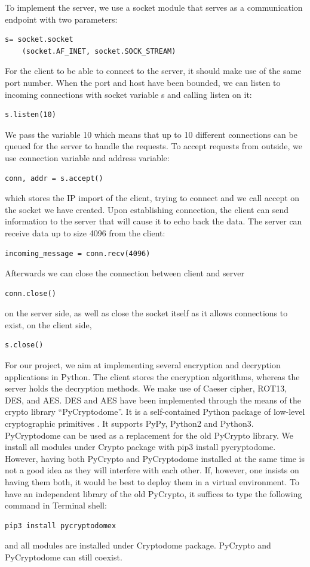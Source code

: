 To implement the server, we use a socket module that serves as a communication endpoint with two parameters:
\begin{verbatim}
s= socket.socket
    (socket.AF_INET, socket.SOCK_STREAM)
\end{verbatim}
For the client to be able to connect to the server, it should make use of the same port number. When the port and host have been bounded, we can listen to incoming connections with socket variable s and calling listen on it:
\begin{verbatim}
s.listen(10)
\end{verbatim}
We pass the variable 10 which means that up to 10 different connections can be queued for the server to handle the requests. To accept requests from outside, we use connection variable and address variable:
\begin{verbatim}
conn, addr = s.accept()
\end{verbatim} 
which stores the IP import of the client, trying to connect and we call accept on the socket we have created. Upon establishing connection, the client can send information to the server that will cause it to echo back the data. The server can receive data up to size 4096 from the client:
\begin{verbatim}
incoming_message = conn.recv(4096)
\end{verbatim} 
Afterwards we can close the connection between client and server
\begin{verbatim} 
conn.close()
\end{verbatim} 
on the server side, as well as close the socket itself as it allows connections to exist, on the client side,
\begin{verbatim} 
s.close()
\end{verbatim}
\par
For our project, we aim at implementing several encryption and decryption applications in Python. The client stores the encryption algorithms, whereas the server holds the decryption methods. We make use of Caeser cipher, ROT13, DES, and AES.
DES and AES have been implemented through the means of the crypto library “PyCryptodome”\cite{pycryptodome}. It is a self-contained Python package of low-level cryptographic primitives \cite{pycryptodome}. It supports PyPy, Python2 and Python3. PyCryptodome can be used as a replacement for the old PyCrypto library. We install all modules under Crypto package with pip3 install pycryptodome.  However, having both PyCrypto and PyCryptodome installed at the same time is not a good idea as they will interfere with each other. If, however, one insists on having them both, it would be best to deploy them in a virtual environment. To have an independent library of the old PyCrypto, it suffices to type the following command in Terminal shell:
\begin{verbatim}
pip3 install pycryptodomex
\end{verbatim} 
and all modules are installed under Cryptodome package. PyCrypto and PyCryptodome can still coexist.


